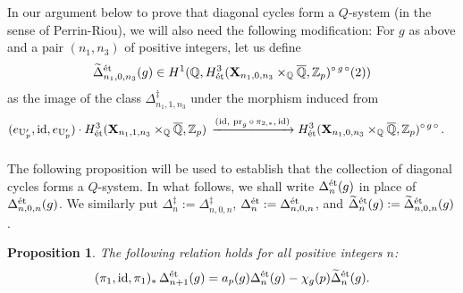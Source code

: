 \documentclass{amsart}
\numberwithin{equation}{section}
\newtheorem{proposition}[theorem]{Proposition}
\newcommand{\QQ}{\mathbb{Q}}
\newcommand{\ZZ}{\mathbb{Z}}
\newcommand{\etale}{\textup{\'et}}
\begin{document}
\subsubsection{}
\label{subsubsec_2025_10_20_1513}
In our argument below to prove that diagonal cycles form a $Q$-system (in the sense of Perrin-Riou), we will also need the following modification: For $g$ as above and a pair $(n_1,n_3)$ of positive integers, let us define 
$$\widetilde{\Delta}_{n_1,0,n_3}^{\etale}(g)\in H^1(\QQ, H^3_{\etale}({\mathbf{X}}_{n_1,0,n_3}\times_\QQ \overline{\QQ},\ZZ_p)^{\circ\,g\,\circ}(2))$$ 
as the image of the class $\Delta_{n_1,1,n_3}^{\ddagger}$ under the morphism induced from
\begin{align*}
          (e_{\mathrm{U}_{p}'}, {\rm id},e_{\mathrm{U}_{p}'})\cdot H^3_{\etale}({\mathbf{X}}_{n_1,1,n_3}\times_\QQ\overline{\QQ},\ZZ_p)
        &\,\xrightarrow{({\rm id},\,{\,\rm pr}_g\,\circ\,\pi_{2,*},\,{\rm id})} H^3_{\etale}({\mathbf{X}}_{n_1,0,n_3}\times_\QQ\overline{\QQ},\ZZ_p)^{\circ\,g\,\circ}\,.
\end{align*}

\subsubsection{}

The following proposition will be used to establish that the collection of diagonal cycles forms a $Q$-system. In what follows, we shall write $\Delta_{n}^{\etale}(g)$ in place of $\Delta_{n,0,n}^{\etale}(g)$. We similarly put $\Delta_n^\ddagger:=\Delta_{n,0,n}^\ddagger$, $\Delta_{n}^{\etale}:=\Delta_{n,0,n}^{\etale}$, and $\widetilde{\Delta}_{n}^{\etale}(g):=\widetilde{\Delta}_{n,0,n}^{\etale}(g)$.

\begin{proposition}
\label{prop_2025_03_08_1203}
   The following relation holds for all positive integers $n$:
    \[
   (\pi_1, {\rm id},\pi_1)_*\,\Delta_{n+1}^{\etale}(g)=a_p(g) \Delta_{n} ^{\etale}(g)-\chi_g(p)\widetilde{\Delta}_{n}^{\etale}(g).
    \]
\end{proposition}
\end{document}
